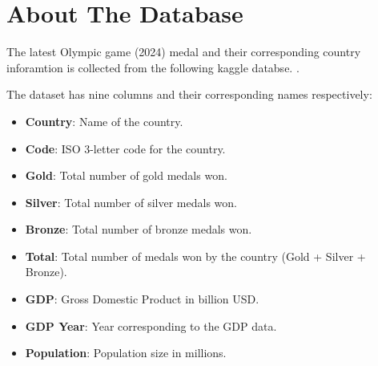 \documentclass[a4paper,12pt]{article}
\begin{document}
 \section{About The Database}
The latest Olympic game (2024) medal and their corresponding country inforamtion is collected from the following kaggle databse.
 \cite{KaggleData}.
 \begin{table}[h!]
     \centering
     \caption{Countries in the 2024 Olympics by medal count and economic indicators}
     \label{tab:dataset}
 \end{table}
 The dataset has nine columns and their corresponding names respectively:
 
 \begin{itemize}
     \item \textbf{Country}: Name of the country.
     \item \textbf{Code}: ISO 3-letter code for the country.
     \item \textbf{Gold}: Total number of gold medals won.
     \item \textbf{Silver}: Total number of silver medals won.
     \item \textbf{Bronze}: Total number of bronze medals won.
     \item \textbf{Total}: Total number of medals won by the country (Gold + Silver + Bronze).
     \item \textbf{GDP}: Gross Domestic Product in billion USD.
     \item \textbf{GDP Year}: Year corresponding to the GDP data.
     \item \textbf{Population}: Population size in millions.
 \end{itemize}
 
\end{document}
